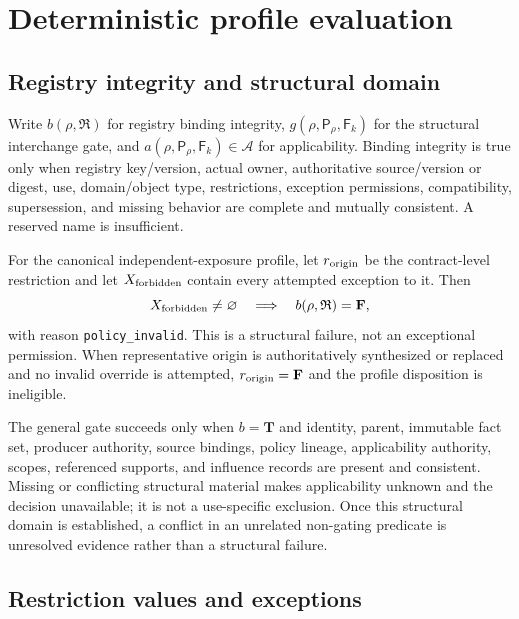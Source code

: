 \section{Deterministic profile evaluation}
\label{sec:equations}

\subsection{Registry integrity and structural domain}

Write $b(\rho,\mathfrak R)$ for registry binding integrity,
$g(\rho,\mathsf P_\rho,\mathsf F_k)$ for the structural interchange gate,
and $a(\rho,\mathsf P_\rho,\mathsf F_k)\in\mathcal A$ for applicability.
Binding integrity is true only when registry key/version, actual owner,
authoritative source/version or digest, use, domain/object type, restrictions,
exception permissions, compatibility, supersession, and missing behavior are
complete and mutually consistent. A reserved name is insufficient.

For the canonical independent-exposure profile, let $r_{\rm origin}$ be the
contract-level restriction and let $X_{\rm forbidden}$ contain every attempted
exception to it. Then
\[
 X_{\rm forbidden}\ne\varnothing
 \quad\Longrightarrow\quad
 b(\rho,\mathfrak R)=\mathbf F,
\]
with reason \texttt{policy\_invalid}. This is a structural failure, not an
exceptional permission. When representative origin is authoritatively
synthesized or replaced and no invalid override is attempted,
$r_{\rm origin}=\mathbf F$ and the profile disposition is ineligible.

The general gate succeeds only when $b=\mathbf T$ and identity, parent,
immutable fact set, producer authority, source bindings, policy lineage,
applicability authority, scopes, referenced supports, and influence records
are present and consistent. Missing or conflicting structural material makes
applicability unknown and the decision unavailable; it is not a use-specific
exclusion. Once this structural domain is established, a conflict in an
unrelated non-gating predicate is unresolved evidence rather than a structural
failure.

\subsection{Restriction values and exceptions}

